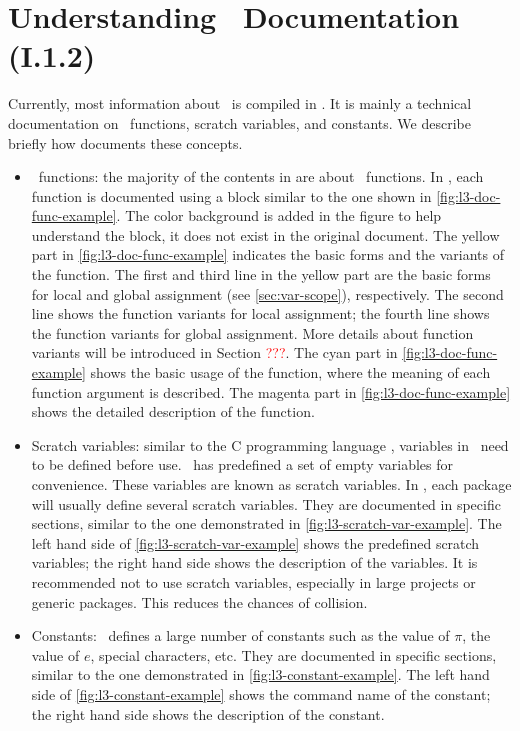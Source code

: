 \documentclass{ltugboat}
\begin{document}
\section{Understanding \liii\ Documentation (I.1.2)}
Currently, most information about \liii\ is compiled in \cite{l3interface}. 
It is mainly a technical documentation on \liii\ functions, scratch variables, and constants. 
We describe briefly how \cite{l3interface} documents these concepts.
\begin{itemize}
\item \liii\ functions: the majority of the contents in \cite{l3interface} are about \liii\ functions.
In \cite{l3interface}, each function is documented using a block similar to the one shown in  \cref{fig:l3-doc-func-example}.
The color background is added in the figure to help understand the block, it does not exist in the original document.
The yellow part in \cref{fig:l3-doc-func-example} indicates the basic forms and the variants of the function. 
The first and third line in the yellow part are the basic forms for local and global assignment (see \cref{sec:var-scope}), respectively.
The second line shows the function variants for local assignment; the fourth line shows the function variants for global assignment.
More details about function variants will be introduced in Section \textcolor{red}{???}.
The cyan part in \cref{fig:l3-doc-func-example} shows the basic usage of the function, where the meaning of each function argument is described.
The magenta part in \cref{fig:l3-doc-func-example} shows the detailed description of the function.
\item Scratch variables: similar to the C programming language \cite{ritchie1988c}, variables in \liii\ need to be defined before use. 
\liii\ has predefined a set of empty variables for convenience.
These variables are known as scratch variables.
In \liii, each package will usually define several scratch variables.
They are documented in specific sections, similar to the one demonstrated in \cref{fig:l3-scratch-var-example}.
The left hand side of \cref{fig:l3-scratch-var-example} shows the predefined scratch variables; the right hand side shows the description of the variables.
It is recommended not to use scratch variables, especially in large projects or generic packages.
This reduces the chances of collision.
\item Constants: \liii\ defines a large number of constants such as the value of $\pi$, the value of $e$, special characters, etc. 
They are documented in specific sections, similar to the one demonstrated in \cref{fig:l3-constant-example}.
The left hand side of \cref{fig:l3-constant-example} shows the command name of the constant; the right hand side shows the description of the constant.
\end{itemize}
\end{document}
